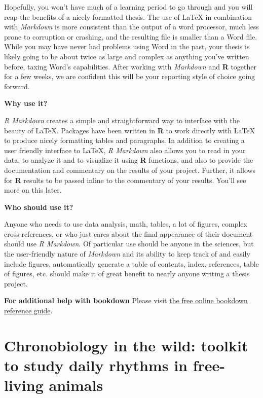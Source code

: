 \documentclass[msc,numbers,hidelinks]{coppe}
\begin{document}
  Hopefully, you won't have much of a learning period to go through and you will reap the benefits of a nicely formatted thesis. The use of LaTeX in combination with \emph{Markdown} is more consistent than the output of a word processor, much less prone to corruption or crashing, and the resulting file is smaller than a Word file. While you may have never had problems using Word in the past, your thesis is likely going to be about twice as large and complex as anything you've written before, taxing Word's capabilities. After working with \emph{Markdown} and \textbf{R} together for a few weeks, we are confident this will be your reporting style of choice going forward.

  \textbf{Why use it?}

  \emph{R Markdown} creates a simple and straightforward way to interface with the beauty of LaTeX. Packages have been written in \textbf{R} to work directly with LaTeX to produce nicely formatting tables and paragraphs. In addition to creating a user friendly interface to LaTeX, \emph{R Markdown} also allows you to read in your data, to analyze it and to visualize it using \textbf{R} functions, and also to provide the documentation and commentary on the results of your project. Further, it allows for \textbf{R} results to be passed inline to the commentary of your results. You'll see more on this later.

  \textbf{Who should use it?}

  Anyone who needs to use data analysis, math, tables, a lot of figures, complex cross-references, or who just cares about the final appearance of their document should use \emph{R Markdown}. Of particular use should be anyone in the sciences, but the user-friendly nature of \emph{Markdown} and its ability to keep track of and easily include figures, automatically generate a table of contents, index, references, table of figures, etc. should make it of great benefit to nearly anyone writing a thesis project.

  \textbf{For additional help with bookdown}
  Please visit \href{https://bookdown.org/yihui/bookdown/}{the free online bookdown reference guide}.

  \hypertarget{chronobiology-in-the-wild-toolkit-to-study-daily-rhythms-in-free-living-animals}{%
  \chapter{Chronobiology in the wild: toolkit to study daily rhythms in free-living animals}\label{chronobiology-in-the-wild-toolkit-to-study-daily-rhythms-in-free-living-animals}}
\end{document}
